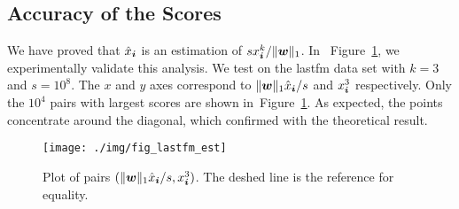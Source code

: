 \documentclass[letterpaper]{article}
\newcommand{\V}[1]{{\boldsymbol{{\MakeLowercase{#1}}}}}
\newcommand{\predx}{\hat{x}_{\V{i}}}
\newcommand{\norm}[2]{\|#1\|_{#2}}
\newcommand{\Fig}[1]{Figure~\ref{fig:#1}}
\begin{document}
\subsection{Accuracy of the Scores}
We have proved that $\predx$ is an estimation of $sx^k_{\V{i}}/\norm{\V{w}}{1}$.
In ~\Fig{Est}, we experimentally validate this analysis.
We test on the lastfm data set with $k=3$ and $s=10^8$.
The $x$ and $y$ axes correspond to $\norm{\V{w}}{1}\hat{x}_{\V{i}}/s$ and $x^3_{\V{i}}$ respectively. 
Only the $10^4$ pairs with largest scores are shown in~\Fig{Est}.
As expected, the points concentrate around the diagonal, 
which confirmed with the theoretical result.

\begin{figure}[]
  \centering
  \texttt{[image: ./img/fig\_lastfm\_est]}\\
  \caption{Plot of pairs $(\norm{\V{w}}{1}\hat{x}_{\V{i}}/s,x^3_{\V{i}})$.
          The deshed line is the reference for equality.}
  \label{fig:Est}
\end{figure}





\end{document}
